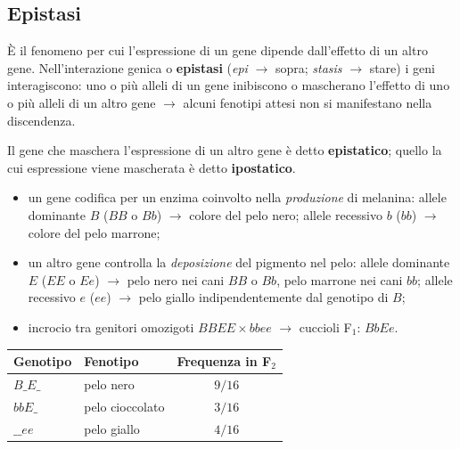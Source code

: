 \subsection{Epistasi}

È il fenomeno per cui l'espressione di un gene dipende dall'effetto di un altro gene. Nell'interazione genica o \textbf{epistasi} (\textit{epi} $\rightarrow$ sopra; \textit{stasis} $\rightarrow$ stare) i geni interagiscono: uno o più alleli di un gene inibiscono o mascherano l'effetto di uno o più alleli di un altro gene $\rightarrow$ alcuni fenotipi attesi non si manifestano nella discendenza.

Il gene che maschera l'espressione di un altro gene è detto \textbf{epistatico}; quello la cui espressione viene mascherata è detto \textbf{ipostatico}.

\begin{itemize}
  \item un gene codifica per un enzima coinvolto nella \textit{produzione} di melanina: allele dominante $B$ ($BB$ o $Bb$) $\rightarrow$ colore del pelo nero; allele recessivo $b$ ($bb$) $\rightarrow$ colore del pelo marrone;
  \item un altro gene controlla la \textit{deposizione} del pigmento nel pelo: allele dominante $E$ ($EE$ o $Ee$) $\rightarrow$ pelo nero nei cani $BB$ o $Bb$, pelo marrone nei cani $bb$; allele recessivo $e$ ($ee$) $\rightarrow$ pelo giallo indipendentemente dal genotipo di $B$;
  \item incrocio tra genitori omozigoti $BBEE \times bbee$ $\rightarrow$ cuccioli F$_1$: $BbEe$.
\end{itemize}

\begin{table}[htbp]
  \centering
  \small
  \renewcommand{\arraystretch}{1.3}
  \begin{tabularx}{\textwidth}{|X|X|c|}
    \hline
    \textbf{Genotipo} & \textbf{Fenotipo} & \textbf{Frequenza in F$_2$} \\
    \hline
    $B\_E\_$ & pelo nero & $9/16$ \\
    \hline
    $bbE\_$ & pelo cioccolato & $3/16$ \\
    \hline
    $\_\_ee$ & pelo giallo & $4/16$ \\
    \hline
  \end{tabularx}
\end{table}
